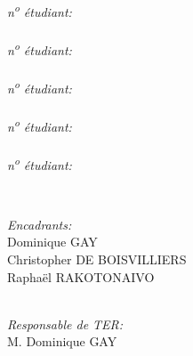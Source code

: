 \begin{titlepage}
\begin{minipage}{0.4\textwidth}
\begin{flushleft}
			\auteurii \\
			\emph{n\textsuperscript{o} étudiant: \numetuii}\\
			\auteuriii \\
			\emph{n\textsuperscript{o} étudiant: \numetuiii}\\
			\auteuriv \\
			\emph{n\textsuperscript{o} étudiant: \numetuiv}\\
			\auteurv \\
			\emph{n\textsuperscript{o} étudiant: \numetuv}\\
			\auteurvi \\
			\emph{n\textsuperscript{o} étudiant: \numetuvi}\\
		\end{flushleft}
	\end{minipage}
	~
	\begin{minipage}{0.5\textwidth} %
		\begin{flushright} \large
			\emph{Encadrants:} \\
			Dominique \textsc{GAY}\\
			Christopher \textsc{DE BOISVILLIERS}\\
			Raphaël \textsc{RAKOTONAIVO}
		\end{flushright}
	\end{minipage}\\[1.7cm]

{\large \emph{Responsable de TER:}}\\[0.2cm]
{\large M. Dominique \textsc{GAY} }\\[0.4cm] %
	
	\vfill %
	
\end{titlepage}
